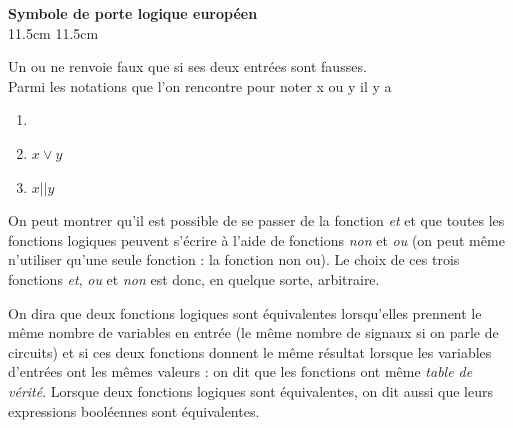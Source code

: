 \documentclass[a4paper,12pt,french]{book}
\begin{document}
{
	\textbf{Symbole de porte logique européen}\\}{11.5cm}
{
	}{11.5cm}

Un \og ou\fg{} ne renvoie faux que si ses deux entrées sont fausses.\\
Parmi les notations que l'on rencontre pour noter \og x ou y\fg{} il y a

\begin{enumerate}[\textbullet]
	\item 	 {}
	\item 	$x\vee y$	
	\item 	$x || y$
\end{enumerate}

On peut montrer qu'il est possible de se passer de la fonction \textit{et} et que toutes les fonctions logiques peuvent s'écrire à l'aide de 
fonctions \textit{non} et \textit{ou} (on peut même n'utiliser qu'une seule fonction : la fonction \og non ou\fg{}). Le choix de ces trois fonctions 
\textit{et}, \textit{ou} et \textit{non} est donc, en quelque sorte, arbitraire.

\begin{definition}
	On dira que deux fonctions logiques sont équivalentes lorsqu'elles prennent le même nombre de variables en entrée (le même nombre de signaux si on parle de circuits) et si ces deux fonctions donnent le même résultat lorsque les variables d'entrées ont les mêmes valeurs : on dit que les fonctions ont même \textit{table de vérité}.
	Lorsque deux fonctions logiques sont équivalentes, on dit aussi que leurs expressions booléennes sont équivalentes.
\end{definition}
\end{document}
